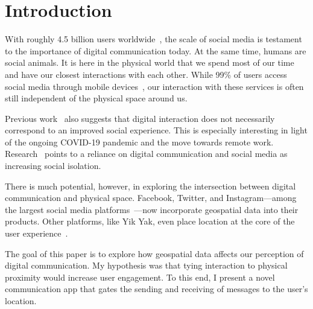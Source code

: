 \section{Introduction}

With roughly 4.5 billion users worldwide~\cite{umaine_2021}, the scale of social media is testament to the importance of digital communication today. At the same time, humans are social animals. It is here in the physical world that we spend most of our time and have our closest interactions with each other. While 99\% of users access social media through mobile devices~\cite{umaine_2021}, our interaction with these services is often still independent of the physical space around us.

Previous work~\cite{ducheneaut_2006} also suggests that digital interaction does not necessarily correspond to an improved social experience. This is especially interesting in light of the ongoing \textsc{COVID}-19 pandemic and the move towards remote work. Research~\cite{bonsaksen_2021,mann_2003} points to a reliance on digital communication and social media as increasing social isolation.

There is much potential, however, in exploring the intersection between digital communication and physical space. Facebook, Twitter, and Instagram—among the largest social media platforms~\cite{umaine_2021}—now incorporate geospatial data into their products. Other platforms, like Yik Yak, even place location at the core of the user experience~\cite{yikyak_2015}.

The goal of this paper is to explore how geospatial data affects our perception of digital communication. My hypothesis was that tying interaction to physical proximity would increase user engagement. To this end, I present a novel communication app that gates the sending and receiving of messages to the user's location.
